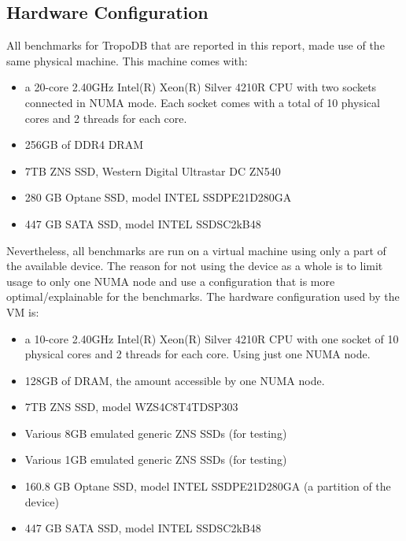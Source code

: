 \subsection{Hardware Configuration}
All benchmarks for TropoDB that are reported in this report, made use of the same physical machine. 
This machine comes with:
\begin{itemize}
    \item a 20-core 2.40GHz Intel(R) Xeon(R) Silver 4210R CPU with two sockets connected in NUMA mode. Each socket comes with a total of 10 physical cores and 2 threads for each core.
    \item 256GB of DDR4 DRAM
    \item 7TB ZNS SSD, Western Digital Ultrastar DC ZN540
    \item 280 GB Optane SSD, model INTEL SSDPE21D280GA
    \item 447 GB SATA SSD, model INTEL SSDSC2kB48
\end{itemize}
Nevertheless, all benchmarks are run on a virtual machine using only a part of the available device. The reason for not using the device as a whole is to limit usage to only one NUMA node and use a configuration that is more optimal/explainable for the benchmarks. The hardware configuration used by the VM is:
\begin{itemize}
    \item a 10-core 2.40GHz Intel(R) Xeon(R) Silver 4210R CPU with one socket of 10 physical cores and 2 threads for each core. Using just one NUMA node.
    \item 128GB of DRAM, the amount accessible by one NUMA node.
    \item 7TB ZNS SSD, model WZS4C8T4TDSP303
    \item Various 8GB emulated generic ZNS SSDs (for testing)
    \item Various 1GB emulated generic ZNS SSDs (for testing)
    \item 160.8 GB Optane SSD, model INTEL SSDPE21D280GA (a partition of the device)
    \item 447 GB SATA SSD, model INTEL SSDSC2kB48
\end{itemize}

